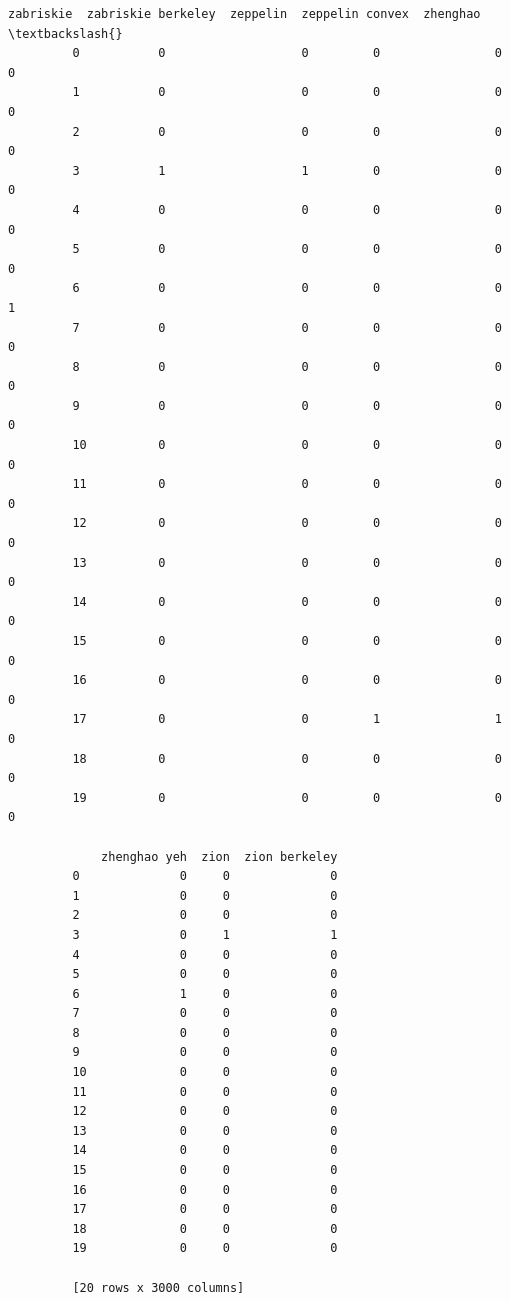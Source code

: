 \documentclass[11pt]{article}
\begin{document}
\begin{Verbatim}[commandchars=\\\{\}]
             zabriskie  zabriskie berkeley  zeppelin  zeppelin convex  zhenghao  \textbackslash{}
         0           0                   0         0                0         0   
         1           0                   0         0                0         0   
         2           0                   0         0                0         0   
         3           1                   1         0                0         0   
         4           0                   0         0                0         0   
         5           0                   0         0                0         0   
         6           0                   0         0                0         1   
         7           0                   0         0                0         0   
         8           0                   0         0                0         0   
         9           0                   0         0                0         0   
         10          0                   0         0                0         0   
         11          0                   0         0                0         0   
         12          0                   0         0                0         0   
         13          0                   0         0                0         0   
         14          0                   0         0                0         0   
         15          0                   0         0                0         0   
         16          0                   0         0                0         0   
         17          0                   0         1                1         0   
         18          0                   0         0                0         0   
         19          0                   0         0                0         0   
         
             zhenghao yeh  zion  zion berkeley  
         0              0     0              0  
         1              0     0              0  
         2              0     0              0  
         3              0     1              1  
         4              0     0              0  
         5              0     0              0  
         6              1     0              0  
         7              0     0              0  
         8              0     0              0  
         9              0     0              0  
         10             0     0              0  
         11             0     0              0  
         12             0     0              0  
         13             0     0              0  
         14             0     0              0  
         15             0     0              0  
         16             0     0              0  
         17             0     0              0  
         18             0     0              0  
         19             0     0              0  
         
         [20 rows x 3000 columns]
\end{Verbatim}
            
\end{document}
